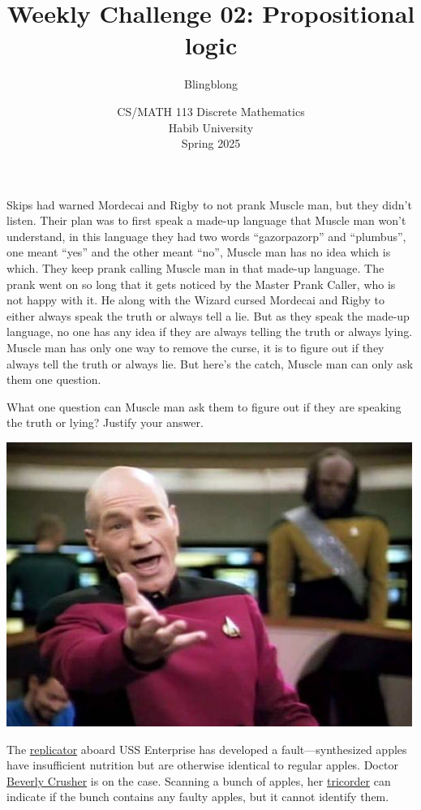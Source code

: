 \documentclass[a4paper]{exam}
\title{Weekly Challenge 02: Propositional logic}
\author{Blingblong} %
\date{CS/MATH 113 Discrete Mathematics\\Habib University\\Spring 2025}
\begin{document}
\maketitle

\begin{questions}
  
Skips had warned Mordecai and Rigby to not prank Muscle man, but they didn't listen.
Their plan was to first speak a made-up language that Muscle man won't understand, in this language they had two words ``gazorpazorp'' and ``plumbus'', one meant ``yes'' and the other meant ``no'', Muscle man has no idea which is which. They keep prank calling Muscle man in that made-up language.
The prank went on so long that it gets noticed by the Master Prank Caller, who is not happy with it. He along with the Wizard cursed Mordecai and Rigby to either always speak the truth or always tell a lie. But as they speak the made-up language, no one has any idea if they are always telling the truth or always lying. Muscle man has only one way to remove the curse, it is to figure out if they always tell the truth or always lie. But here's the catch, Muscle man can only ask them one question. 

What one question can Muscle man ask them to figure out if they are speaking the truth or lying? Justify your answer.
\begin{solution}
\end{solution}

  \begin{minipage}{.3\linewidth}
  \centerline{\includegraphics[width=\textwidth]{picard}}
\end{minipage}
\begin{minipage}{.65\linewidth}
  The \href{https://en.wikipedia.org/wiki/Replicator_(Star_Trek)}{replicator} aboard USS Enterprise has developed a fault---synthesized apples have insufficient nutrition but are otherwise identical to regular apples. Doctor \href{https://memory-alpha.fandom.com/wiki/Beverly_Crusher}{Beverly Crusher} is on the case. Scanning a bunch of apples, her \href{https://en.wikipedia.org/wiki/Medical_tricorder}{tricorder} can indicate if the bunch contains any faulty apples, but it cannot identify them.
\end{minipage}


\end{questions}
\end{document}
